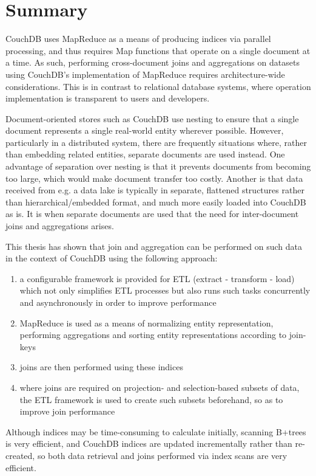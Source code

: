 \section{Summary}
CouchDB uses MapReduce as a means of producing indices via parallel processing, and thus requires Map functions that operate on a single document at a time. As such, performing cross-document joins and aggregations on datasets using CouchDB's implementation of MapReduce requires architecture-wide considerations. This is in contrast to relational database systems, where operation implementation is transparent to users and developers.

Document-oriented stores such as CouchDB use nesting to ensure that a single document represents a single real-world entity wherever possible. However, particularly in a distributed system, there are frequently situations where, rather than embedding related entities, separate documents are used instead. One advantage of separation over nesting is that it prevents documents from becoming too large, which would make document transfer too costly. Another is that data received from e.g. a data lake is typically in separate, flattened structures rather than hierarchical/embedded format, and much more easily loaded into CouchDB as is. It is when separate documents are used that the need for inter-document joins and aggregations arises.

This thesis has shown that join and aggregation can be performed on such data in the context of CouchDB using the following approach:

\begin{enumerate}
    \item a configurable framework is provided for ETL (extract - transform - load) which not only simplifies ETL processes but also runs such tasks concurrently and asynchronously in order to improve performance
    \item MapReduce is used as a means of normalizing entity representation, performing aggregations and sorting entity representations according to join-keys
    \item joins are then performed using these indices
    \item where joins are required on projection- and selection-based subsets of data, the ETL framework is used to create such subsets beforehand, so as to improve join performance
\end{enumerate}

Although indices may be time-consuming to calculate initially, scanning B+trees is very efficient, and CouchDB indices are updated incrementally rather than re-created, so both data retrieval and joins performed via index scans are very efficient.

